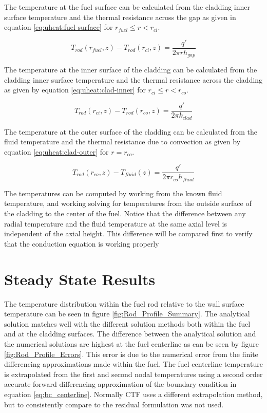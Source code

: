 The temperature at the fuel surface can be calculated from the cladding inner
surface temperature and the thermal resistance across the gap as given in equation
\ref{eq:uheat:fuel-surface} for $r_{fuel} \leq r < r_{ci}$.

\begin{equation}
	\label{eq:uheat:fuel-surface}
	T_{rod}(r_{fuel},z)-T_{rod}(r_{ci},z)
	=\frac{q'}{2 \pi r h_{gap}}
\end{equation}

The temperature at the inner surface of the cladding can be calculated from the
cladding inner surface temperature and the thermal resistance across the 
cladding as given by equation \ref{eq:uheat:clad-inner} for $r_{ci} \leq r
< r_{co}$.

\begin{equation}
	\label{eq:uheat:clad-inner}
	T_{rod}(r_{ci},z)-T_{rod}(r_{co},z)
	=\frac{q'}{2 \pi k_{clad}}
\end{equation}

The temperature at the outer surface of the cladding can be calculated from the
fluid temperature and the thermal resistance due to convection as given by
equation \ref{eq:uheat:clad-outer} for $ r = r_{co}$.

\begin{equation}
	\label{eq:uheat:clad-outer}
	T_{rod}(r_{co},z)-T_{fluid}(z)
	=\frac{q'}{2 \pi r_{co} h_{fluid}}
\end{equation}

The temperatures can be computed by working from the known fluid temperature,
and  working solving for temperatures from the outside surface of the cladding
to the  center of the fuel. Notice that the difference between any radial
temperature  and the fluid temperature at the same axial level is independent of
the axial height.  This difference will be compared first to verify that the
conduction equation is working properly

\section{Steady State Results}

The temperature distribution within the fuel rod relative to the wall surface
temperature can be seen in figure \ref{fig:Rod_Profile_Summary}. The analytical
solution matches well with the  different solution methods both within the fuel
and at the cladding surfaces.  The difference between the analytical solution
and the numerical solutions are  highest at the fuel centerline as can be seen
by figure \ref{fig:Rod_Profile_Errors}. This error is due to the numerical
error from  the finite differencing approximations made within the fuel. The
fuel centerline  temperature  is extrapolated from the first and second nodal
temperatures  using a second order accurate forward differencing approximation
of the  boundary condition in equation \ref{eq:bc_centerline}. Normally CTF 
uses a different extrapolation method, but to consistently compare  to the
residual formulation was not used.

